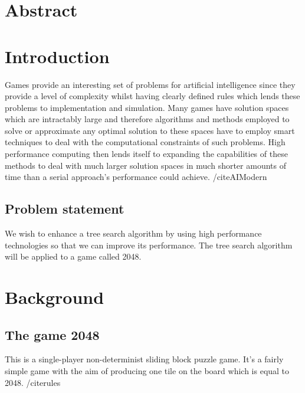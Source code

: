 \documentclass[11pt]{article}
\begin{document}
\begin{page}
\clearpage
\setcounter{page}{1}

\section{Abstract}

\section{Introduction}
Games provide an interesting set of problems for artificial intelligence since they provide a level of complexity whilst having clearly defined rules which lends these problems to implementation and simulation. Many games have solution spaces which are intractably large and therefore algorithms and methods employed to solve or approximate any optimal solution to these spaces have to employ smart techniques to deal with the computational constraints of such problems. High performance computing then lends itself to expanding the capabilities of these methods to deal with much larger solution spaces in much shorter amounts of time than a serial approach’s performance could achieve. /cite{AIModern}

\subsection{Problem statement}
We wish to enhance a tree search algorithm by using high performance technologies so that we can improve its performance. The tree search algorithm will be applied to a game called 2048.

\section{Background}
\subsection{The game 2048}
This is a single-player non-determinist sliding block puzzle game. It’s a fairly simple game with the aim of producing one tile on the board which is equal to 2048. /cite{rules}


\end{page}
\end{document}
